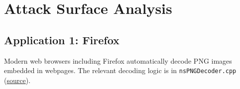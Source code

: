 \documentclass[letterpaper,twocolumn,10pt]{article}
\begin{document}
\section{Attack Surface Analysis}
\label{sec:q6}
\subsection{Application 1: Firefox}




Modern web browsers including Firefox automatically decode PNG images embedded in webpages. The relevant decoding logic is in
\lstinline|nsPNGDecoder.cpp| (\href{https://github.com/mozilla-firefox/firefox/blob/main/image/decoders/nsPNGDecoder.cpp}{source}).
\end{document}
